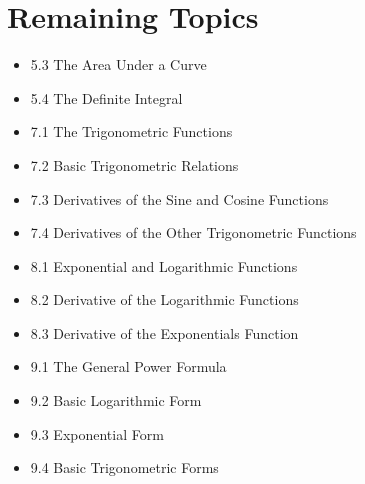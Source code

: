 \documentclass[11pt]{article}
\begin{document}
\section*{Remaining Topics}

\begin{itemize}
  \item 5.3 The Area Under a Curve
  \item 5.4 The Definite Integral
  \item 7.1 The Trigonometric Functions
  \item 7.2 Basic Trigonometric Relations
  \item 7.3 Derivatives of the Sine and Cosine Functions
  \item 7.4 Derivatives of the Other Trigonometric Functions
  \item 8.1 Exponential and Logarithmic Functions
  \item 8.2 Derivative of the Logarithmic Functions
  \item 8.3 Derivative of the Exponentials Function
  \item 9.1 The General Power Formula
  \item 9.2 Basic Logarithmic Form
  \item 9.3 Exponential Form
  \item 9.4 Basic Trigonometric Forms
\end{itemize}
\end{document}
